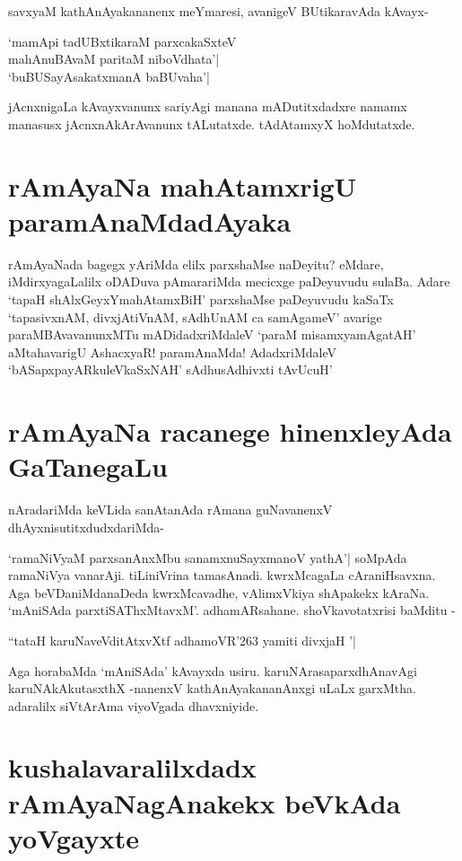 savxyaM kathAnAyakananenx meYmaresi, avanigeV BUtikaravAda kAvayx-

\begin{shloka}
`mamApi tadUBxtikaraM parxcakaSxteV\label{211d}\\
mahAnuBAvaM paritaM niboVdhata'|\\
`buBUSayAsakatxmanA baBUvaha'|\label{211c}
\end{shloka}
jAcnxnigaLa kAvayxvanunx sariyAgi manana mADutitxdadxre namamx manasusx jAcnxnAkArAvanunx tALutatxde. tAdAtamxyX hoMdutatxde.

\section*{rAmAyaNa mahAtamxrigU paramAnaMdadAyaka}

rAmAyaNada bagegx yAriMda elilx parxshaMse naDeyitu? eMdare, iMdirxyagaLalilx oDADuva pAmarariMda mecicxge paDeyuvudu sulaBa. Adare `tapaH shAlxGeyxYmahAtamxBiH'\label{211} parxshaMse paDeyuvudu kaSaTx `tapasivxnAM, divxjAtiVnAM, sAdhUnAM ca samAgameV' avarige paraMBAvavanunxMTu mADidadxriMdaleV `paraM misamxyamAgatAH'\label{211a} aMtahavarigU AshacxyaR! paramAnaMda! AdadxriMdaleV `bASapxpayARkuleVkaSxNAH'\label{211b} sAdhusAdhivxti tAvUcuH'\label{211g}

\section*{rAmAyaNa racanege hinenxleyAda GaTanegaLu}

nAradariMda keVLida sanAtanAda rAmana guNavanenxV dhAyxnisutitxdudxdariMda-

`ramaNiVyaM parxsanAnxMbu\label{211f} sanamxnuSayxmanoV yathA'| soMpAda ramaNiVya vanarAji. tiLiniVrina tamasAnadi. kwrxMcagaLa cAraniHsavxna. Aga beVDaniMdanaDeda kwrxMcavadhe, vAlimxVkiya shApakekx kAraNa. `mAniSAda parxtiSAThxMtavxM'. adhamARsahane. shoVkavotatxrisi baMditu -

\begin{shloka}
``tataH karuNaveVditAtxvXtf adhamoVR\char'263 yamiti divxjaH '|\label{211i}
\end{shloka}

Aga horabaMda `mAniSAda' kAvayxda usiru. karuNArasaparxdhAnavAgi karuNAkAkutasxthX  -nanenxV kathAnAyakananAnxgi uLaLx garxMtha. adaralilx siVtArAma viyoVgada dhavxniyide.

\section*{kushalavaralilxdadx rAmAyaNagAnakekx beVkAda yoVgayxte}

